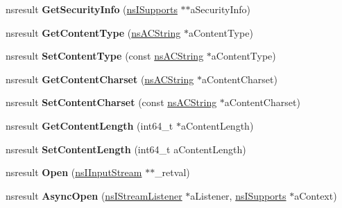 \begin{DoxyCompactItemize}
nsresult {\bfseries Get\+Security\+Info} (\hyperlink{interfacens_i_supports}{ns\+I\+Supports} $\ast$$\ast$a\+Security\+Info)
\item 
\mbox{\label{interfacens_i_channel_a200487555ab29edabeee5ac727b14e21}} 
nsresult {\bfseries Get\+Content\+Type} (\hyperlink{structns_c_string_container}{ns\+A\+C\+String} $\ast$a\+Content\+Type)
\item 
\mbox{\label{interfacens_i_channel_a2d579f9799acced94e05a2d304710dfc}} 
nsresult {\bfseries Set\+Content\+Type} (const \hyperlink{structns_c_string_container}{ns\+A\+C\+String} $\ast$a\+Content\+Type)
\item 
\mbox{\label{interfacens_i_channel_abd48c4dbf2e6fdfd1a0bd346a3185fec}} 
nsresult {\bfseries Get\+Content\+Charset} (\hyperlink{structns_c_string_container}{ns\+A\+C\+String} $\ast$a\+Content\+Charset)
\item 
\mbox{\label{interfacens_i_channel_a7147c3a5fbbc7dfba021f3c54eda8b86}} 
nsresult {\bfseries Set\+Content\+Charset} (const \hyperlink{structns_c_string_container}{ns\+A\+C\+String} $\ast$a\+Content\+Charset)
\item 
\mbox{\label{interfacens_i_channel_a2c8753bd015186f85a70a7067e33fbbd}} 
nsresult {\bfseries Get\+Content\+Length} (int64\+\_\+t $\ast$a\+Content\+Length)
\item 
\mbox{\label{interfacens_i_channel_acb0dcee5957919cc2a1567468821cfe6}} 
nsresult {\bfseries Set\+Content\+Length} (int64\+\_\+t a\+Content\+Length)
\item 
\mbox{\label{interfacens_i_channel_a922a706ec270129a4c1a9e62e3fb0526}} 
nsresult {\bfseries Open} (\hyperlink{interfacens_i_input_stream}{ns\+I\+Input\+Stream} $\ast$$\ast$\+\_\+retval)
\item 
\mbox{\label{interfacens_i_channel_aa1fe8972f53fd6a573e05b25730ae985}} 
nsresult {\bfseries Async\+Open} (\hyperlink{interfacens_i_stream_listener}{ns\+I\+Stream\+Listener} $\ast$a\+Listener, \hyperlink{interfacens_i_supports}{ns\+I\+Supports} $\ast$a\+Context)

\end{DoxyCompactItemize}
